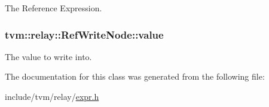 The Reference Expression. 

\subsubsection[{\texorpdfstring{value}{value}}]{ tvm\+::relay\+::\+Ref\+Write\+Node\+::value}\hypertarget{classtvm_1_1relay_1_1RefWriteNode_a3f9952c82acd7f413188a9920b239e37}{}\label{classtvm_1_1relay_1_1RefWriteNode_a3f9952c82acd7f413188a9920b239e37}


The value to write into. 



The documentation for this class was generated from the following file\+:\begin{DoxyCompactItemize}
\item 
include/tvm/relay/\hyperlink{relay_2expr_8h}{expr.\+h}\end{DoxyCompactItemize}
